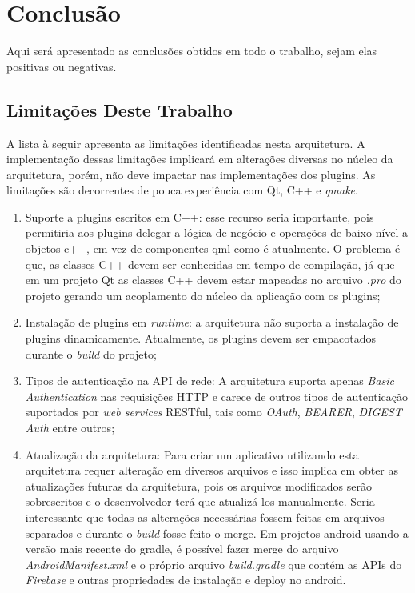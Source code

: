 \section{Conclusão}\label{sec:conclusao}
Aqui será apresentado as conclusões obtidos em todo o trabalho, sejam elas positivas ou negativas.


\subsection{Limitações Deste Trabalho}
A lista à seguir apresenta as limitações identificadas nesta arquitetura. A implementação dessas limitações implicará em alterações diversas no núcleo da arquitetura, porém, não deve impactar nas implementações dos plugins. As limitações são decorrentes de pouca experiência com Qt, C++ e \textit{qmake}.

\begin{enumerate}
	\item Suporte a plugins escritos em C++: esse recurso seria importante, pois permitiria aos plugins delegar a lógica de negócio e operações de baixo nível a objetos c++, em vez de componentes qml como é atualmente. O problema é que, as classes C++ devem ser conhecidas em tempo de compilação, já que em um projeto Qt as classes C++ devem estar mapeadas no arquivo \textit{.pro} do projeto gerando um acoplamento do núcleo da aplicação com os plugins;

	\item Instalação de plugins em \textit{runtime}: a arquitetura não suporta a instalação de plugins dinamicamente. Atualmente, os plugins devem ser empacotados durante o \textit{build} do projeto;

	\item Tipos de autenticação na API de rede: A arquitetura suporta apenas \textit{Basic Authentication} nas requisições HTTP e carece de outros tipos de autenticação suportados por \textit{web services} RESTful, tais como \textit{OAuth}, \textit{BEARER}, \textit{DIGEST Auth} entre outros;

	\item Atualização da arquitetura: Para criar um aplicativo utilizando esta arquitetura requer alteração em diversos arquivos e isso implica em obter as atualizações futuras da arquitetura, pois os arquivos modificados serão sobrescritos e o desenvolvedor terá que atualizá-los manualmente. Seria interessante que todas as alterações necessárias fossem feitas em arquivos separados e durante o \textit{build} fosse feito o merge. Em projetos android usando a versão mais recente do gradle, é possível fazer merge do arquivo \textit{AndroidManifest.xml} e o próprio arquivo \textit{build.gradle} que contém as APIs do \textit{Firebase} e outras propriedades de instalação e deploy no android.
\end{enumerate}


